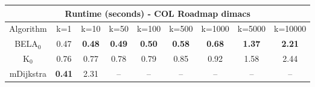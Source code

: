 \begin{tabular}{c|cccccccc}\toprule
\multicolumn{9}{c}{Runtime (seconds) - COL Roadmap dimacs}\\ \midrule
Algorithm & k=1 & k=10 & k=50 & k=100 & k=500 & k=1000 & k=5000 & k=10000 \\ \midrule
BELA$_0$ & 0.47 & \textbf{0.48} & \textbf{0.49} & \textbf{0.50} & \textbf{0.58} & \textbf{0.68} & \textbf{1.37} & \textbf{2.21} \\
K$_0$ & 0.76 & 0.77 & 0.78 & 0.79 & 0.85 & 0.92 & 1.58 & 2.44 \\
mDijkstra & \textbf{0.41} & 2.31 & -- & -- & -- & -- & -- & -- \\ \bottomrule 
\end{tabular}
